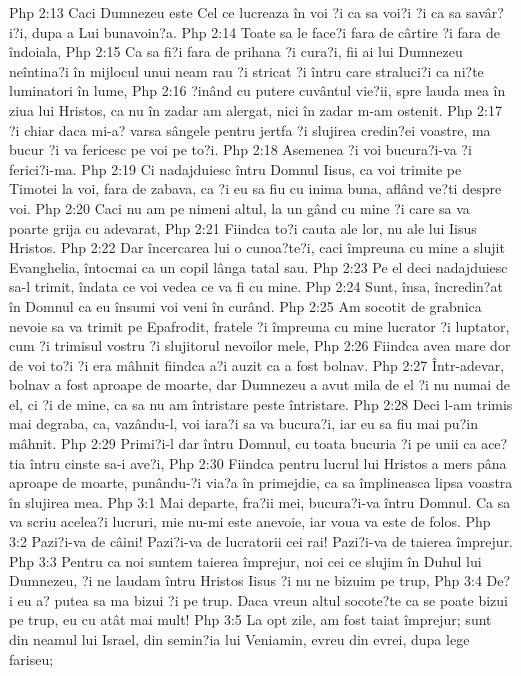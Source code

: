 Php 2:13  Caci Dumnezeu este Cel ce lucreaza în voi ?i ca sa voi?i ?i ca sa savâr?i?i, dupa a Lui bunavoin?a.
Php 2:14  Toate sa le face?i fara de cârtire ?i fara de îndoiala,
Php 2:15  Ca sa fi?i fara de prihana ?i cura?i, fii ai lui Dumnezeu neîntina?i în mijlocul unui neam rau ?i stricat ?i întru care straluci?i ca ni?te luminatori în lume,
Php 2:16  ?inând cu putere cuvântul vie?ii, spre lauda mea în ziua lui Hristos, ca nu în zadar am alergat, nici în zadar m-am ostenit.
Php 2:17  ?i chiar daca mi-a? varsa sângele pentru jertfa ?i slujirea credin?ei voastre, ma bucur ?i va fericesc pe voi pe to?i.
Php 2:18  Asemenea ?i voi bucura?i-va ?i ferici?i-ma.
Php 2:19  Ci nadajduiesc întru Domnul Iisus, ca voi trimite pe Timotei la voi, fara de zabava, ca ?i eu sa fiu cu inima buna, aflând ve?ti despre voi.
Php 2:20  Caci nu am pe nimeni altul, la un gând cu mine ?i care sa va poarte grija cu adevarat,
Php 2:21  Fiindca to?i cauta ale lor, nu ale lui Iisus Hristos.
Php 2:22  Dar încercarea lui o cunoa?te?i, caci împreuna cu mine a slujit Evanghelia, întocmai ca un copil lânga tatal sau.
Php 2:23  Pe el deci nadajduiesc sa-l trimit, îndata ce voi vedea ce va fi cu mine.
Php 2:24  Sunt, însa, încredin?at în Domnul ca eu însumi voi veni în curând.
Php 2:25  Am socotit de grabnica nevoie sa va trimit pe Epafrodit, fratele ?i împreuna cu mine lucrator ?i luptator, cum ?i trimisul vostru ?i slujitorul nevoilor mele,
Php 2:26  Fiindca avea mare dor de voi to?i ?i era mâhnit fiindca a?i auzit ca a fost bolnav.
Php 2:27  Într-adevar, bolnav a fost aproape de moarte, dar Dumnezeu a avut mila de el ?i nu numai de el, ci ?i de mine, ca sa nu am întristare peste întristare.
Php 2:28  Deci l-am trimis mai degraba, ca, vazându-l, voi iara?i sa va bucura?i, iar eu sa fiu mai pu?in mâhnit.
Php 2:29  Primi?i-l dar întru Domnul, cu toata bucuria ?i pe unii ca ace?tia întru cinste sa-i ave?i,
Php 2:30  Fiindca pentru lucrul lui Hristos a mers pâna aproape de moarte, punându-?i via?a în primejdie, ca sa împlineasca lipsa voastra în slujirea mea.
Php 3:1  Mai departe, fra?ii mei, bucura?i-va întru Domnul. Ca sa va scriu acelea?i lucruri, mie nu-mi este anevoie, iar voua va este de folos.
Php 3:2  Pazi?i-va de câini! Pazi?i-va de lucratorii cei rai! Pazi?i-va de taierea împrejur.
Php 3:3  Pentru ca noi suntem taierea împrejur, noi cei ce slujim în Duhul lui Dumnezeu, ?i ne laudam întru Hristos Iisus ?i nu ne bizuim pe trup,
Php 3:4  De?i eu a? putea sa ma bizui ?i pe trup. Daca vreun altul socote?te ca se poate bizui pe trup, eu cu atât mai mult!
Php 3:5  La opt zile, am fost taiat împrejur; sunt din neamul lui Israel, din semin?ia lui Veniamin, evreu din evrei, dupa lege fariseu;
